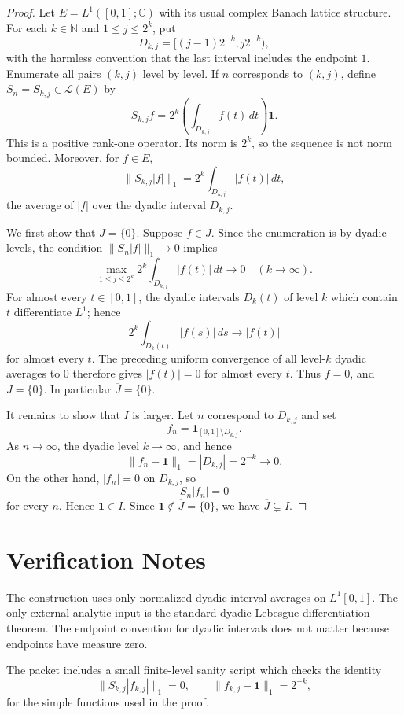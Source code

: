 \documentclass[11pt]{amsart}
\newcommand{\C}{\mathbb{C}}
\newcommand{\N}{\mathbb{N}}
\newcommand{\one}{\mathbf{1}}
\begin{document}
\begin{proof}
Let \(E=L^1([0,1];\C)\) with its usual complex Banach lattice structure.  For
each \(k\in\N\) and \(1\le j\le 2^k\), put
\[
  D_{k,j}=\big[(j-1)2^{-k},j2^{-k}\big),
\]
with the harmless convention that the last interval includes the endpoint
\(1\). Enumerate all pairs \((k,j)\) level by level. If \(n\) corresponds to
\((k,j)\), define \(S_n=S_{k,j}\in\mathcal L(E)\) by
\[
  S_{k,j}f
  =2^k\left(\int_{D_{k,j}} f(t)\,dt\right)\one .
\]
This is a positive rank-one operator. Its norm is \(2^k\), so the sequence is
not norm bounded. Moreover, for \(f\in E\),
\[
  \|S_{k,j}|f|\|_1
  =2^k\int_{D_{k,j}} |f(t)|\,dt,
\]
the average of \(|f|\) over the dyadic interval \(D_{k,j}\).

We first show that \(J=\{0\}\). Suppose \(f\in J\). Since the enumeration is by
dyadic levels, the condition \(\|S_n|f|\|_1\to0\) implies
\[
  \max_{1\le j\le 2^k} 2^k\int_{D_{k,j}} |f(t)|\,dt \longrightarrow 0
  \quad (k\to\infty).
\]
For almost every \(t\in[0,1]\), the dyadic intervals \(D_k(t)\) of level \(k\)
which contain \(t\) differentiate \(L^1\); hence
\[
  2^k\int_{D_k(t)} |f(s)|\,ds \longrightarrow |f(t)|
\]
for almost every \(t\). The preceding uniform convergence of all level-\(k\)
dyadic averages to \(0\) therefore gives \(|f(t)|=0\) for almost every \(t\).
Thus \(f=0\), and \(J=\{0\}\). In particular \(\overline J=\{0\}\).

It remains to show that \(I\) is larger. Let \(n\) correspond to \(D_{k,j}\)
and set
\[
  f_n=\one_{[0,1]\setminus D_{k,j}} .
\]
As \(n\to\infty\), the dyadic level \(k\to\infty\), and hence
\[
  \|f_n-\one\|_1=|D_{k,j}|=2^{-k}\longrightarrow 0.
\]
On the other hand, \(|f_n|=0\) on \(D_{k,j}\), so
\[
  S_n|f_n|=0
\]
for every \(n\). Hence \(\one\in I\). Since \(\one\notin\overline J=\{0\}\),
we have \(\overline J\subsetneq I\).
\end{proof}

\section*{Verification Notes}

The construction uses only normalized dyadic interval averages on
\(L^1[0,1]\). The only external analytic input is the standard dyadic
Lebesgue differentiation theorem. The endpoint convention for dyadic intervals
does not matter because endpoints have measure zero.

The packet includes a small finite-level sanity script which checks the
identity
\[
  \|S_{k,j}|f_{k,j}|\|_1=0,\qquad \|f_{k,j}-\one\|_1=2^{-k},
\]
for the simple functions used in the proof.
\end{document}
